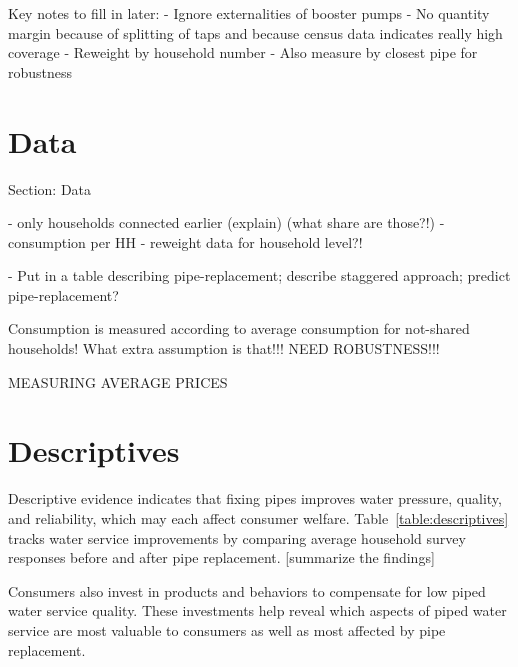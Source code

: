 \documentclass[12pt,table]{article}
\begin{document}
Key notes to fill in later:
- Ignore externalities of booster pumps
- No quantity margin because of splitting of taps and because census data indicates really high coverage
- Reweight by household number
- Also measure by closest pipe for robustness


\section{Data}

Section: Data

	- only households connected earlier (explain) (what share are those?!)
	- consumption per HH
	- reweight data for household level?!

	- Put in a table describing pipe-replacement;  describe staggered approach; predict pipe-replacement?

Consumption is measured according to average consumption for not-shared households!  What extra assumption is that!!!  NEED ROBUSTNESS!!! 

MEASURING AVERAGE PRICES


\section{Descriptives}

Descriptive evidence indicates that fixing pipes improves water pressure, quality, and reliability, which may each affect consumer welfare.  Table~\ref{table:descriptives} tracks water service improvements by comparing average household survey responses before and after pipe replacement.   [summarize the findings]

Consumers also invest in products and behaviors to compensate for low piped water service quality.  These investments help reveal which aspects of piped water service are most valuable to consumers as well as most affected by pipe replacement.  
\end{document}
